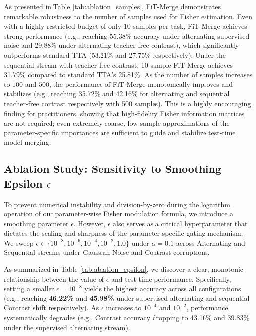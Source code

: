 \documentclass{article}
\theoremstyle{plain}
\theoremstyle{definition}
\theoremstyle{remark}
\begin{document}
As presented in Table \ref{tab:ablation_samples}, FiT-Merge demonstrates remarkable robustness to the number of samples used for Fisher estimation. Even with a highly restricted budget of only $10$ samples per task, FiT-Merge achieves strong performance (e.g., reaching 55.38\% accuracy under alternating supervised noise and 29.88\% under alternating teacher-free contrast), which significantly outperforms standard TTA (53.21\% and 27.75\% respectively). Under the sequential stream with teacher-free contrast, 10-sample FiT-Merge achieves 31.79\% compared to standard TTA's 25.81\%. As the number of samples increases to $100$ and $500$, the performance of FiT-Merge monotonically improves and stabilizes (e.g., reaching 35.72\% and 42.16\% for alternating and sequential teacher-free contrast respectively with 500 samples). This is a highly encouraging finding for practitioners, showing that high-fidelity Fisher information matrices are not required; even extremely coarse, low-sample approximations of the parameter-specific importances are sufficient to guide and stabilize test-time model merging.

\subsection{Ablation Study: Sensitivity to Smoothing Epsilon $\epsilon$}

To prevent numerical instability and division-by-zero during the logarithm operation of our parameter-wise Fisher modulation formula, we introduce a smoothing parameter $\epsilon$. However, $\epsilon$ also serves as a critical hyperparameter that dictates the scaling and sharpness of the parameter-specific gating mechanism. We sweep $\epsilon \in \{10^{-8}, 10^{-6}, 10^{-4}, 10^{-2}, 1.0\}$ under $\alpha = 0.1$ across Alternating and Sequential streams under Gaussian Noise and Contrast corruptions.

As summarized in Table \ref{tab:ablation_epsilon}, we discover a clear, monotonic relationship between the value of $\epsilon$ and test-time performance. Specifically, setting a smaller $\epsilon = 10^{-8}$ yields the highest accuracy across all configurations (e.g., reaching \textbf{46.22\%} and \textbf{45.98\%} under supervised alternating and sequential Contrast shift respectively). As $\epsilon$ increases to $10^{-4}$ and $10^{-2}$, performance systematically degrades (e.g., Contrast accuracy dropping to 43.16\% and 39.83\% under the supervised alternating stream). 
\end{document}
